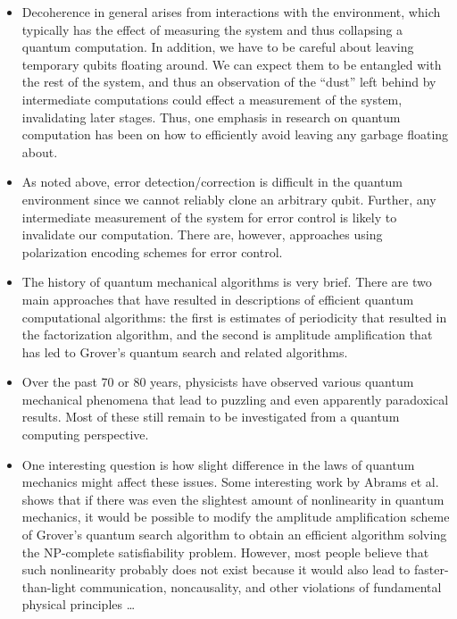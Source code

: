 \documentclass{article}
\def\pagedone{\newpage}
\begin{document}
\begin{itemize}
\item Decoherence in general arises from interactions with the environment, which typically has the effect of measuring the system and thus collapsing a quantum computation.  In addition, we have to be careful about leaving temporary qubits floating around.  We can expect them to be entangled with the rest of the system, and thus an observation of the ``dust'' left behind by intermediate computations could effect a measurement of the system, invalidating later stages.  Thus, one emphasis in research on quantum computation has been on how to efficiently avoid leaving any garbage floating about.

\pagedone

\item As noted above, error detection/correction is difficult in the quantum environment since we cannot reliably clone an arbitrary qubit.  Further, any intermediate measurement of the system for error control is likely to invalidate our computation.  There are, however, approaches using polarization encoding schemes for error control.
\end{itemize}
\pagedone

\begin{itemize}

\item The history of quantum mechanical algorithms is very brief.  There are two main approaches that have resulted in descriptions of efficient quantum computational algorithms: the first is estimates of periodicity that resulted in the factorization algorithm, and the second is amplitude amplification
that has led to Grover's quantum search and related algorithms.
\item Over the past 70 or 80 years, physicists have observed various quantum mechanical phenomena that lead to puzzling and even
apparently paradoxical results. Most of these still remain to be investigated from a quantum computing perspective.
\pagedone
\item One interesting question is how slight difference in the laws of quantum mechanics might affect these issues. Some interesting work by Abrams et al. shows that if there was even the slightest amount of nonlinearity in quantum mechanics, it would be possible to modify the amplitude amplification scheme of Grover's quantum search algorithm to obtain an efficient algorithm solving the NP-complete satisfiability problem. However, most people
believe that such nonlinearity probably does not exist because it would also lead to faster-than-light communication, noncausality, and other violations of fundamental physical principles \ldots


\end{itemize}
\pagedone
\end{document}
